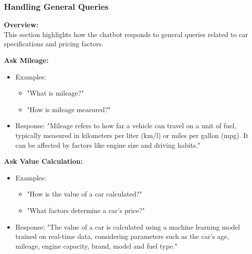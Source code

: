 \documentclass{beamer}
\begin{document}
\begin{frame}
	\frametitle{Handling General Queries}

	\textbf{Overview:} \\
This section highlights how the chatbot responds to general queries related to car specifications and pricing factors.

	\textbf{Ask Mileage:}
	\begin{itemize}
		\item Examples:
		\begin{itemize}
			\item "What is mileage?"
			\item "How is mileage measured?"
		\end{itemize}
		\item Response: "Mileage refers to how far a vehicle can travel on a unit of fuel, typically measured in kilometers per liter (km/l) or miles per gallon (mpg). It can be affected by factors like engine size and driving habits."
	\end{itemize}

	\textbf{Ask Value Calculation:}
	\begin{itemize}
		\item Examples:
		\begin{itemize}
			\item "How is the value of a car calculated?"
			\item "What factors determine a car's price?"
		\end{itemize}
		\item Response: "The value of a car is calculated using a machine learning model trained on real-time data, considering parameters such as the car's age, mileage, engine capacity, brand, model and fuel type."
	\end{itemize}

\end{frame}
\end{document}
